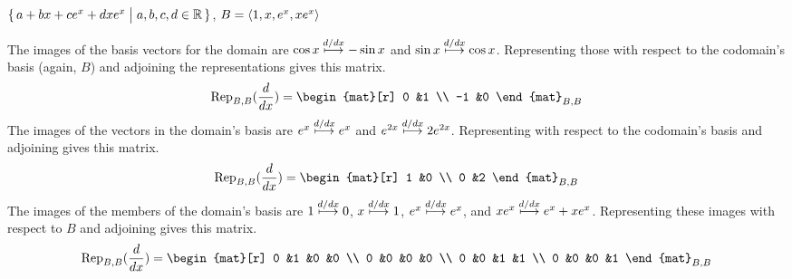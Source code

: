 \begin{exercises}
\begin{exparts}
      \partsitem \( \mbox{$\{\,a+bx+ce^x+dxe^{x} \bigm| a,b,c,d\in\mathbb{R}\,\}$} \),
         \( B=\langle1,x,e^x,xe^{x}\rangle \)
    \end{exparts}
    \begin{answer}
      \begin{exparts}
        \partsitem The images of the basis vectors for the domain are
         \( \cos x\stackrel{d/dx}{\longmapsto}-\sin x \) and
          \( \sin x\stackrel{d/dx}{\longmapsto}\cos x \).
          Representing those with respect to the codomain's basis (again, $B$)
          and adjoining the representations gives this matrix.
          \begin{equation*}
            \rep{\frac{d}{dx}}{B,B}=
            \begin{mat}[r]
                0  &1  \\
               -1  &0
            \end{mat}_{B,B}
          \end{equation*}
        \partsitem The images of the vectors in the domain's basis are 
          \( e^x\stackrel{d/dx}{\longmapsto}e^x \) and
          \( e^{2x}\stackrel{d/dx}{\longmapsto}2e^{2x} \).
          Representing with respect to the codomain's basis and adjoining
          gives this matrix.
          \begin{equation*}
            \rep{\frac{d}{dx}}{B,B}=
            \begin{mat}[r]
                1  &0  \\
                0  &2
            \end{mat}_{B,B}
          \end{equation*}
        \partsitem The images of the members of the domain's basis are 
          \( 1\stackrel{d/dx}{\longmapsto}0 \), 
          \( x\stackrel{d/dx}{\longmapsto}1 \),
          \( e^{x}\stackrel{d/dx}{\longmapsto}e^{x} \), and
          \( xe^{x}\stackrel{d/dx}{\longmapsto}e^x+xe^x \).
          Representing these images with respect to $B$ and adjoining
          gives this matrix.
          \begin{equation*}
            \rep{\frac{d}{dx}}{B,B}=
            \begin{mat}[r]
                0  &1  &0  &0 \\
                0  &0  &0  &0 \\
                0  &0  &1  &1 \\
                0  &0  &0  &1
            \end{mat}_{B,B}
          \end{equation*}
      \end{exparts}  

\end{answer}
\end{exercises}
